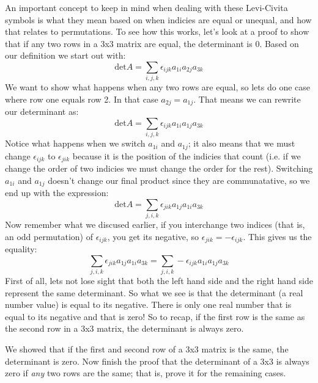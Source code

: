 An important concept to keep in mind when dealing with these Levi-Civita symbols is what they mean based on when indicies are equal or unequal, and how that relates to permutations.  To see how this works, let's look at a proof to show that if any two rows in a 3x3 matrix are equal, the determinant is 0.  Based on our definition we start out with:
\[
\text{det} A = \sum_{i,j,k} \epsilon_{ijk} a_{1i} a_{2j} a_{3k}
\]
We want to show what happens when any two rows are equal, so lets do one case where row one equals row 2.  In that case $a_{2j}=a_{1j}$.  That means we can rewrite our determinant as:
\[
\text{det} A =  \sum_{i,j,k} \epsilon_{ijk} a_{1i} a_{1j} a_{3k}
\]
Notice what happens when we switch $a_{1i}$ and $a_{1j}$; it also means that we must change $\epsilon_{ijk}$ to $\epsilon_{jik}$ because it is the position of the indicies that count (i.e. if we change the order of two indicies we must change the order for the rest).  Switching $a_{1i}$ and $a_{1j}$ doesn't change our final product since they are communatative, so we end up with the expression:
\[
\text{det} A =   \sum_{j,i,k} \epsilon_{jik} a_{1j} a_{1i} a_{3k} 
\]
Now remember what we discused earlier, if you interchange two indices (that is, an odd permutation) of $\epsilon_{ijk}$, you get its negative, so $\epsilon_{jik}=-\epsilon_{ijk}$.  This gives us the equality:
\[
\sum_{j,i,k} \epsilon_{jik} a_{1j} a_{1i} a_{3k}=\sum_{j,i,k} - \epsilon_{ijk} a_{1i} a_{1j} a_{3k}
\]
First of all, lets not lose sight that both the left hand side and the right hand side represent the same determinant.  So what we see is that the determinant (a real number value) is equal to its negative.  There is only one real number that is equal to its negative and that is zero!  So to recap, if the first row is the same as the second row in a 3x3 matrix, the determinant is always zero.

\begin{exercise}{}
We showed that if the first and second row of a 3x3 matrix is the same, the determinant is zero.  Now finish the proof that the determinant of a 3x3 is always zero if \emph{any} two rows are the same; that is, prove it for the remaining cases.
\end{exercise}{} 

